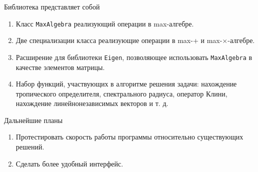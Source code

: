 \documentclass[11pt]{beamer}
\begin{document}
\begin{frame}
Библиотека представляет собой
		\begin{enumerate}
			\item Класс \texttt{MaxAlgebra} реализующий операции в max-алгебре.
      \maxalglst
		\end{enumerate}
\end{frame}

\begin{frame}
		\begin{enumerate}
      \setcounter{enumi}{1}
			\item Две специализации класса реализующие операции в max-+ и max-$\times$-алгебре.
      \maxplustimeslst
		\end{enumerate}
\end{frame}

\begin{frame}
		\begin{enumerate}
      \setcounter{enumi}{2}
			\item Расширение для библиотеки \texttt{Eigen}, позволяющее использовать \texttt{MaxAlgebra} в качестве элементов матрицы.
			\item Набор функций, участвующих в алгоритме решения задачи: нахождение тропического определителя, спектрального радиуса, оператор Клини, нахождение линейнонезависимых векторов и т. д.
		\end{enumerate}
\end{frame}

\begin{frame}{Дальнейшие планы}
	\begin{enumerate}
		\item Протестировать скорость работы программы относительно существующих решений.
		\item Сделать более удобный интерфейс.
	\end{enumerate}
\end{frame}
\end{document}
